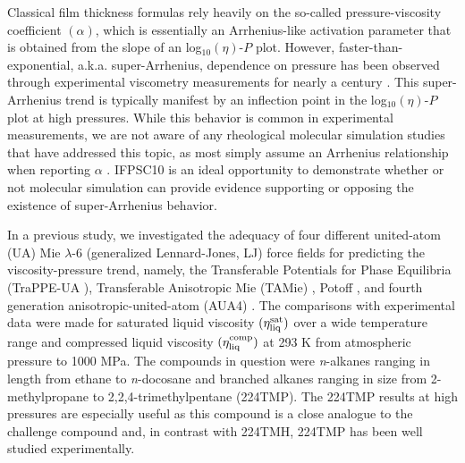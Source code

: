 \documentclass[preprint,review,12pt]{elsarticle}
\begin{document}
	Classical film thickness formulas rely heavily on the so-called pressure-viscosity coefficient $(\alpha)$, which is essentially an Arrhenius-like activation parameter that is obtained from the slope of an log$_{10}(\eta)$-$P$ plot. However, faster-than-exponential, a.k.a. super-Arrhenius, dependence on pressure has been observed through experimental viscometry measurements for nearly a century \cite{Bair2016}. This super-Arrhenius trend is typically manifest by an inflection point in the log$_{10}(\eta)$-$P$ plot at high pressures. While this behavior is common in experimental measurements, we are not aware of any rheological molecular simulation studies that have addressed this topic, as most simply assume an Arrhenius relationship when reporting $\alpha$ \cite{Mundy1996,McCabe2001,Liu2015}. IFPSC10 is an ideal opportunity to demonstrate whether or not molecular simulation can provide evidence supporting or opposing the existence of super-Arrhenius behavior.
	
	
	In a previous study, we investigated the adequacy of four different united-atom (UA) Mie $\lambda$-6 (generalized Lennard-Jones, LJ) force fields for predicting the viscosity-pressure trend, namely, the Transferable Potentials for Phase Equilibria (TraPPE-UA \cite{TraPPE,Martin1999,TraPPEUA2}), Transferable Anisotropic Mie (TAMie) \cite{TAMie,Weidler2016}, Potoff \cite{Mie,Potoff_branched}, and fourth generation anisotropic-united-atom (AUA4) \cite{AUA4,Nieto2008}. The comparisons with experimental data were made for saturated liquid viscosity $(\eta_{\rm liq}^{\rm sat})$ over a wide temperature range and compressed liquid viscosity $(\eta_{\rm liq}^{\rm comp})$ at 293 K from atmospheric pressure to 1000 MPa. The compounds in question were \textit{n}-alkanes ranging in length from ethane to \textit{n}-docosane and branched alkanes ranging in size from 2-methylpropane to 2,2,4-trimethylpentane (224TMP). The 224TMP results at high pressures are especially useful as this compound is a close analogue to the challenge compound and, in contrast with 224TMH, 224TMP has been well studied experimentally.
	
\end{document}
